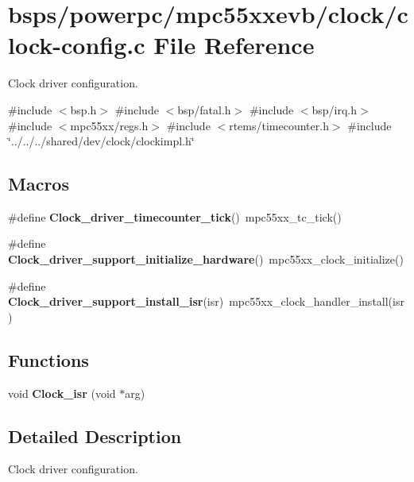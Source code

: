 \hypertarget{mpc55xxevb_2clock_2clock-config_8c}{}\section{bsps/powerpc/mpc55xxevb/clock/clock-\/config.c File Reference}
\label{mpc55xxevb_2clock_2clock-config_8c}


Clock driver configuration.  


{\ttfamily \#include $<$bsp.\+h$>$}\newline
{\ttfamily \#include $<$bsp/fatal.\+h$>$}\newline
{\ttfamily \#include $<$bsp/irq.\+h$>$}\newline
{\ttfamily \#include $<$mpc55xx/regs.\+h$>$}\newline
{\ttfamily \#include $<$rtems/timecounter.\+h$>$}\newline
{\ttfamily \#include \char`\"{}../../../shared/dev/clock/clockimpl.\+h\char`\"{}}\newline
\subsection*{Macros}
\begin{DoxyCompactItemize}
\item 
\mbox{\label{mpc55xxevb_2clock_2clock-config_8c_aa900bda9f945295c0c4a4b00ec91f7da}} 
\#define {\bfseries Clock\+\_\+driver\+\_\+timecounter\+\_\+tick}()~mpc55xx\+\_\+tc\+\_\+tick()
\item 
\mbox{\label{mpc55xxevb_2clock_2clock-config_8c_a37475981ff0420ed43474fb3bdde8cbf}} 
\#define {\bfseries Clock\+\_\+driver\+\_\+support\+\_\+initialize\+\_\+hardware}()~mpc55xx\+\_\+clock\+\_\+initialize()
\item 
\mbox{\label{mpc55xxevb_2clock_2clock-config_8c_a9ceaea4d5c663943f1ee7da161c0c52e}} 
\#define {\bfseries Clock\+\_\+driver\+\_\+support\+\_\+install\+\_\+isr}(isr)~mpc55xx\+\_\+clock\+\_\+handler\+\_\+install(isr)
\end{DoxyCompactItemize}
\subsection*{Functions}
\begin{DoxyCompactItemize}
\item 
\mbox{\label{mpc55xxevb_2clock_2clock-config_8c_ac430ca6732bedd57d4bd97f10a57702f}} 
void {\bfseries Clock\+\_\+isr} (void $\ast$arg)
\end{DoxyCompactItemize}


\subsection{Detailed Description}
Clock driver configuration. 

